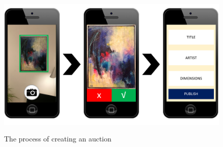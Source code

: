 \begin{figure}[H]
    \centering
\caption{The process of creating an auction}
\includegraphics[width=16cm]{Appendix/HorizontalPrototype/5.png}
\label{CreateAuction}
\end{figure}


